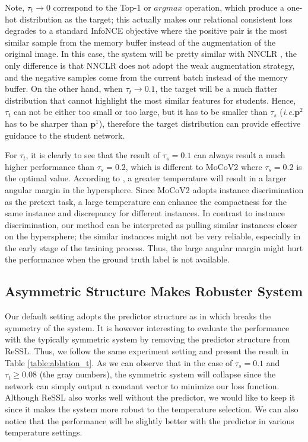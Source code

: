 \documentclass{article}
\newcommand{\<}{\left\langle}
\renewcommand{\>}{\right\rangle}
\newcommand{\ie}{{\emph{i.e.}}}
\begin{document}
Note, $\tau_t \rightarrow 0$ correspond to the Top-1 or $argmax$ operation, which produce a one-hot distribution as the target; this actually makes our relational consistent loss degrades to a standard InfoNCE objective where the positive pair is the most similar sample from the memory buffer instead of the augmentation of the original image. In this case, the system will be pretty similar with NNCLR \cite{nnclr}, the only difference is that NNCLR does not adopt the weak augmentation strategy, and the negative samples come from the current batch instead of the memory buffer.  On the other hand, when $\tau_t \rightarrow 0.1$, the target will be a much flatter distribution that cannot highlight the most similar features for students. Hence, $\tau_t$ can not be either too small or too large, but it has to be smaller than $\tau_s$ (\ie $\mathbf{p}^2$ has to be sharper than $\mathbf{p}^1$), therefore the target distribution can provide effective guidance to the student network. 




For $\tau_t$, it is clearly to see that the result of $\tau_s = 0.1$ can always result a much higher performance than $\tau_s = 0.2$, which is different to MoCoV2 where $\tau_s = 0.2$ is the optimal value. According to \cite{NormFace, CosFace, ArcFace}, a greater temperature will result in a larger angular margin in the hypersphere. Since MoCoV2 adopts instance discrimination as the pretext task, a large temperature can enhance the compactness for the same instance and discrepancy for different instances. In contrast to instance discrimination, our method can be interpreted as pulling similar instances closer on the hypersphere; the similar instances might not be very reliable, especially in the early stage of the training process. Thus, the large angular margin might hurt the performance when the ground truth label is not available. 

\subsection{Asymmetric Structure Makes Robuster System} 
Our default setting adopts the predictor structure as in \cite{byol, SimSiam} which breaks the symmetry of the system. It is however interesting to evaluate the performance with the typically symmetric system by removing the predictor structure from ReSSL. Thus, we follow the same experiment setting and present the result in Table \ref{table:ablation_t}. As we can observe that in the case of $\tau_s = 0.1$ and $\tau_t \ge 0.08$ (the gray numbers), the symmetric system will collapse since the network can simply output a constant vector to minimize our loss function. Although ReSSL also works well without the predictor, we would like to keep it since it makes the system more robust to the temperature selection. We can also notice that the performance will be slightly better with the predictor in various temperature settings.
\end{document}
